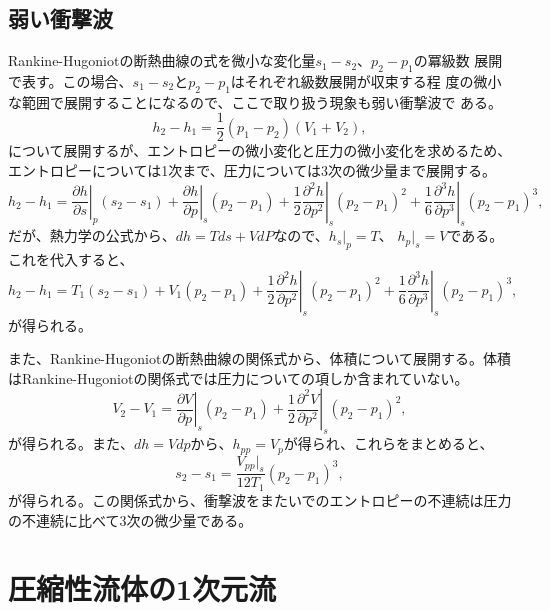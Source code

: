 \subsection{弱い衝撃波}
Rankine-Hugoniotの断熱曲線の式を微小な変化量$s_1-s_2$、$p_2-p_1$の冪級数
展開で表す。この場合、$s_1-s_2$と$p_2-p_1$はそれぞれ級数展開が収束する程
度の微小な範囲で展開することになるので、ここで取り扱う現象も弱い衝撃波で
ある。
\begin{equation}
 h_2 - h_1
  = \frac{1}{2} (p_1 - p_2) (V_1 + V_2),
\end{equation}
について展開するが、エントロピーの微小変化と圧力の微小変化を求めるため、
エントロピーについては1次まで、圧力については3次の微少量まで展開する。
\begin{equation}
 h_2 - h_1 
  = \left.\frac{\partial h}{\partial s}\right|_p (s_2 - s_1)
  + \left.\frac{\partial h}{\partial p}\right|_s (p_2 - p_1)
  + \frac{1}{2}\left.\frac{\partial^2 h}{\partial p^2}\right|_s (p_2 - p_1)^2
  + \frac{1}{6}\left.\frac{\partial^3 h}{\partial p^3}\right|_s (p_2 - p_1)^3,
\end{equation}
だが、熱力学の公式から、$dh = Tds + VdP$なので、$h_s|_p=T$、
$h_p|_s=V$である。これを代入すると、
\begin{equation}
 h_2 - h_1 
  = T_1 (s_2 - s_1)
  + V_1 (p_2 - p_1)
  + \frac{1}{2}\left.\frac{\partial^2 h}{\partial p^2}\right|_s (p_2 - p_1)^2
  + \frac{1}{6}\left.\frac{\partial^3 h}{\partial p^3}\right|_s (p_2 - p_1)^3,
\end{equation}
が得られる。

また、Rankine-Hugoniotの断熱曲線の関係式から、体積について展開する。体積
はRankine-Hugoniotの関係式では圧力についての項しか含まれていない。
\begin{equation}
 V_2 - V_1 
  = \left.\frac{\partial V}{\partial p}\right|_s (p_2 - p_1)
  + \frac{1}{2} \left.\frac{\partial^2 V}{\partial p^2}\right|_s (p_2 - p_1)^2,
\end{equation}
が得られる。また、$dh=Vdp$から、$h_{pp} = V_p$が得られ、これらをまとめると、
\begin{equation}
 s_2 - s_1 = 
  \frac{V_{pp}|_s}{12T_1} (p_2 - p_1)^3,
\end{equation}
が得られる。この関係式から、衝撃波をまたいでのエントロピーの不連続は圧力
の不連続に比べて3次の微少量である。


\section{圧縮性流体の1次元流}
